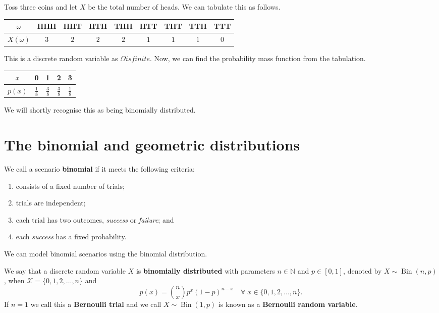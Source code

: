 \begin{example}
    Toss three coins and let $X$ be the total number of heads. We can tabulate this as follows.
    \begin{center}
        \begin{tabular}{ccccccccc}
            \toprule
            $\omega$ & HHH & HHT & HTH & THH & HTT & THT & TTH & TTT \\
            \midrule
            $X(\omega)$ & $3$ & $2$ & $2$ & $2$ & $1$ & $1$ & $1$ & $0$ \\
            \bottomrule
        \end{tabular}
    \end{center}
    This is a discrete random variable as $\Omega is finite$. Now, we can find the probability mass function from the tabulation.
    \begin{center}
        \begin{tabular}{ccccc}
            \toprule
            $x$ & 0 & 1 & 2 & 3 \\
            \midrule
            $p(x)$ & $\frac18$ & $\frac38$ & $\frac38$ & $\frac18$ \\
            \bottomrule
        \end{tabular}
    \end{center}
    We will shortly recognise this as being binomially distributed.
\end{example}

\section{The binomial and geometric distributions}

We call a scenario \textbf{binomial} if it meets the following criteria:
\begin{enumerate}
    \item consists of a fixed number of trials;
    \item trials are independent;
    \item each trial has two outcomes, \emph{success} or \emph{failure}; and
    \item each \emph{success} has a fixed probability.
\end{enumerate}

We can model binomial scenarios using the binomial distribution.

\begin{definition}
    We say that a discrete random variable $X$ is \textbf{binomially distributed} with parameters $n \in \mathbb N$ and $p \in [0, 1]$, denoted by $X \sim \operatorname{Bin}(n, p)$, when $\mathcal X = \{ 0, 1, 2, \ldots, n \}$ and \[ p(x) = \binom{n}{x} p^x (1 - p)^{n - x} \quad \forall \; x \in \{ 0, 1, 2, \ldots, n \}. \] If $n = 1$ we call this a \textbf{Bernoulli trial} and we call $X \sim \operatorname{Bin}(1, p)$ is known as a \textbf{Bernoulli random variable}.
\end{definition}

